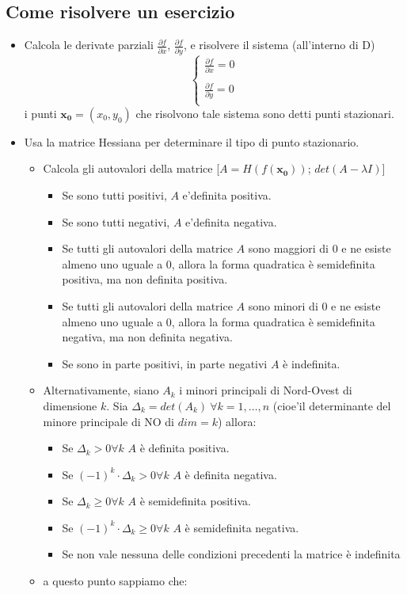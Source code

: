 \documentclass[a4paper,12pt]{book}
\begin{document}
\subsection{Come risolvere un esercizio}
\begin{itemize}
\item Calcola le derivate parziali $\frac{\partial f}{\partial x}$, $\frac{\partial f}{\partial y}$, e risolvere il sistema (all'interno di D)
\begin{displaymath}
\left\{ \begin{array}{ll}
\frac{\partial f}{\partial x}=0\\
\\
\frac{\partial f}{\partial y}=0\\
\end{array} \right.
\end{displaymath}
i punti $\boldsymbol{x_0}=(x_0,y_0)$ che risolvono tale sistema sono detti punti stazionari.

\item Usa la matrice Hessiana per determinare il tipo di punto stazionario.
\begin{itemize}
 \item Calcola gli autovalori della matrice [$A = H(f(\boldsymbol{x_0}))$; $det(A-\lambda I)$]
 \begin{itemize}
 \item Se sono tutti positivi, $A$ e'definita positiva.
 \item Se sono tutti negativi, $A$ e'definita negativa.
 \item Se tutti gli autovalori della matrice $A$ sono maggiori di $0$ e ne esiste almeno uno uguale a $0$, allora la forma quadratica è semidefinita positiva, ma non definita positiva.
 \item Se tutti gli autovalori della matrice $A$ sono minori di $0$ e ne esiste almeno uno uguale a $0$, allora la forma quadratica è semidefinita negativa, ma non definita negativa.
 \item Se sono in parte positivi, in parte negativi $A$ è indefinita.
 \end{itemize}
 \item Alternativamente, siano $A_k$ i minori principali di Nord-Ovest di dimensione $k$.
Sia $\Delta_k=det(A_k)\ \forall k=1,\dots,n$ (cioe'il determinante del minore principale di NO di $dim=k$) allora:
 \begin{itemize}
  \item Se $\Delta_k > 0 \forall k$ $A$ è definita positiva.
  \item Se $(-1)^k\cdot\Delta_k > 0 \forall k$ $A$  è definita negativa.
  \item Se $\Delta_k \geq 0 \forall k$ $A$ è semidefinita positiva. 
  \item Se $(-1)^k\cdot\Delta_k \geq 0 \forall k$ $A$  è semidefinita negativa. 
  \item Se non vale nessuna delle condizioni precedenti la matrice è indefinita 
 \end{itemize}
 \item a questo punto sappiamo che:
 \begin{itemize}


\end{itemize}
\end{itemize}
\end{itemize}
\end{document}
